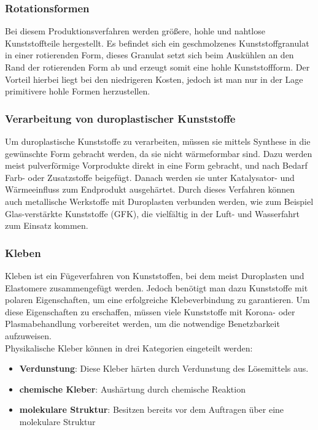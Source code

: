 \subsubsection{Rotationsformen}
Bei diesem Produktionsverfahren werden größere, hohle und nahtlose Kunststoffteile hergestellt.
Es befindet sich ein geschmolzenes Kunststoffgranulat in einer rotierenden Form, dieses Granulat setzt sich beim Auskühlen an den
Rand der rotierenden Form ab und erzeugt somit eine hohle Kunststoffform.
Der Vorteil hierbei liegt bei den niedrigeren Kosten, jedoch ist man nur in der Lage primitivere hohle Formen herzustellen.

\subsubsection{Verarbeitung von duroplastischer Kunststoffe}
Um duroplastische Kunststoffe zu verarbeiten, müssen sie mittels Synthese in die gewünschte Form gebracht werden, da sie
nicht wärmeformbar sind.
Dazu werden meist pulverförmige Vorprodukte direkt in eine Form gebracht, und nach Bedarf Farb- oder Zusatzstoffe beigefügt.
Danach werden sie unter Katalysator- und Wärmeeinfluss zum Endprodukt ausgehärtet.
Durch dieses Verfahren können auch metallische Werkstoffe mit Duroplasten verbunden werden, wie zum Beispiel
Glas-verstärkte Kunststoffe (GFK), die vielfältig in der Luft- und Wasserfahrt zum Einsatz kommen.

\subsubsection{Kleben}
Kleben ist ein Fügeverfahren von Kunststoffen, bei dem meist Duroplasten und Elastomere zusammengefügt werden.
Jedoch benötigt man dazu Kunststoffe mit polaren Eigenschaften, um eine erfolgreiche Klebeverbindung zu garantieren.
Um diese Eigenschaften zu erschaffen, müssen viele Kunststoffe mit Korona- oder Plasmabehandlung vorbereitet werden,
um die notwendige Benetzbarkeit aufzuweisen.\\
Physikalische Kleber können in drei Kategorien eingeteilt werden:
\begin{itemize}
    \item \textbf{Verdunstung}: Diese Kleber härten durch Verdunstung des Lösemittels aus.
    \item \textbf{chemische Kleber}: Aushärtung durch chemische Reaktion
    \item \textbf{molekulare Struktur}: Besitzen bereits vor dem Auftragen über eine molekulare Struktur
\end{itemize}

